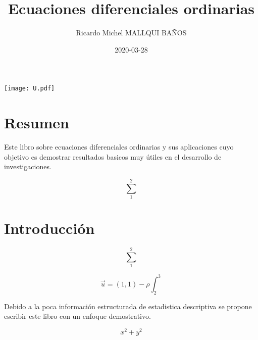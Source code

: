 \documentclass[10pt,]{krantz}
\title{Ecuaciones diferenciales ordinarias}
\author{Ricardo Michel MALLQUI BAÑOS}
\institute{Universidad Nacional San Cristóbal De Huamanga}
\date{2020-03-28}
\theoremstyle{definition}
\theoremstyle{definition}
\theoremstyle{definition}
\theoremstyle{remark}
\begin{document}
\maketitle

\thispagestyle{empty}
\begin{center}
\texttt{[image: U.pdf]}
\end{center}


{
\hypersetup{linkcolor=}
\setcounter{tocdepth}{2}
\tableofcontents
}
\listoftables
\listoffigures
\newcommand{\N}{\mathbb{N}}
\newcommand{\R}{\mathbb{R}}
\newcommand{\CC}{\mathbb{C}}
\newcommand{\I}{\mathbb{I}}
\newcommand{\f}{\mathbb{f}}
\newcommand{\X}{\mathbb{X}}
\newcommand{\D}{\mathbb{D}}
\newcommand{\Z}{\mathbb{Z}}
\newcommand{\Q}{\mathbb{Q}}
\newcommand{\norm}[1]{\left\Vert#1\right\Vert}
\newcommand{\abs}[1]{\left\vert#1\right\vert}
\newcommand{\set}[1]{\left\{#1\right\}}
\newcommand{\seq}[1]{\left<#1\right>}
\newcommand{\co}[1]{\left[#1\right]}
\newcommand{\cc}[1]{\left(#1\right)}
\newcommand{\J}{\mathcal{J}}
\newcommand{\K}{\mathcal{K}}
\newcommand{\M}{\mathcal{M}}
\newcommand{\F}{\mathcal{F}}

\hypertarget{resumen}{%
\chapter*{Resumen}\label{resumen}}


Este libro sobre ecuaciones diferenciales ordinarias y sus aplicaciones cuyo objetivo es demostrar resultados basicos muy útiles en el desarrollo de investigaciones.

\[\sum_1^2\]

\hypertarget{introducciuxf3n}{%
\chapter*{Introducción}\label{introducciuxf3n}}


\[\sum_1^2\]

\[\vec{u}=(1,1)-\rho\int_2^3\]

Debido a la poca información estructurada de estadistica descriptiva se propone escribir este libro con un enfoque demostrativo.

\[x^2+y^2\]

\mainmatter
\end{document}
